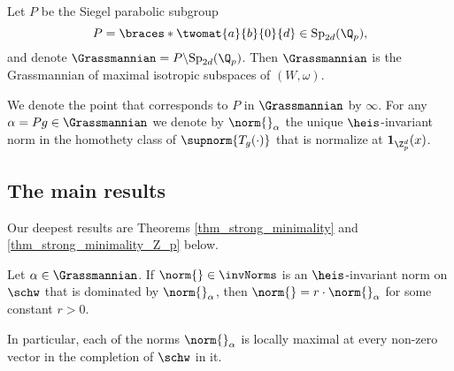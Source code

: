 Let $P$ be the Siegel parabolic subgroup 
\[P=\braces*{\twomat{a}{b}{0}{d}\in \mathrm{Sp}_{2d}(\Q_p)},\]
and denote $\Grassmannian=P\backslash \mathrm{Sp}_{2d}(\Q_p)$.
Then $\Grassmannian$ is the Grassmannian of maximal isotropic subspaces of $(W,\omega)$.
\begin{defn}
We denote the point that corresponds to $P$ in $\Grassmannian$ by $\infty$.
For any $\alpha=Pg\in \Grassmannian$ we denote by $\norm{}_\alpha$ the unique $\heis$-invariant norm in the homothety class of $\supnorm{T_g(\cdot)}$ that is normalize at $\textbf{1}_{\Z_p^d}(x)$.
\end{defn} 

\subsection{The main results}
Our deepest results are Theorems \ref{thm_strong_minimality} and \ref{thm_strong_minimality_Z_p} below.
\begin{thm}[Rigidity]\label{thm_strong_minimality}
Let $\alpha\in\Grassmannian$.
If $\norm{}\in \invNorms$ is an $\heis$-invariant norm on $\schw$ that is dominated by $\norm{}_\alpha$, then $\norm{}=r\cdot \norm{}_\alpha$ for some constant $r>0$.    
\end{thm} 
In particular, each of the norms $\norm{}_\alpha$ is locally maximal at every non-zero vector in the completion of $\schw$ in it. 

